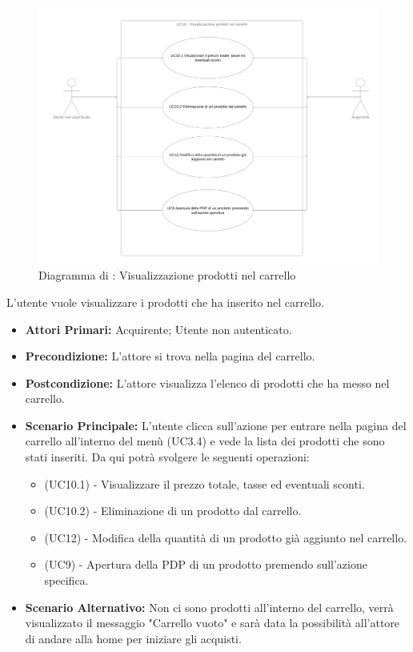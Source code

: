 \begin{figure}[H]
    \centering
    \includegraphics[width=\textwidth]{Immagini/DiagrammiUC/UC10VisualizzazioneProdottiNelCarrello.png}
    \caption{Diagramma di \actualUC: Visualizzazione prodotti nel carrello} 
    \label{fig:VisualizzazioneProdottiNelCarrello}
\end{figure}
L'utente vuole visualizzare i prodotti che ha inserito nel carrello.
\begin{itemize}
    \item \textbf{Attori Primari:} Acquirente; Utente non autenticato.
    \item \textbf{Precondizione:} L'attore si trova nella pagina del carrello.
    \item \textbf{Postcondizione:} L'attore visualizza l'elenco di prodotti che ha messo nel carrello.
    \item \textbf{Scenario Principale:} L'utente clicca sull'azione per entrare nella pagina del carrello all'interno del menù (UC3.4) e vede la lista dei prodotti che sono stati inseriti. Da qui potrà svolgere le seguenti operazioni:
    \begin{itemize}
        \item (UC10.1) - Visualizzare il prezzo totale, tasse ed eventuali sconti.
        \item (UC10.2) - Eliminazione di un prodotto dal carrello.
        \item (UC12) - Modifica della quantità di un prodotto già aggiunto nel carrello.
        \item (UC9) - Apertura della PDP di un prodotto premendo sull'azione specifica.
    \end{itemize}
    \item \textbf{Scenario Alternativo:} Non ci sono prodotti all'interno del carrello, verrà visualizzato il messaggio "Carrello vuoto" e sarà data la possibilità all'attore di andare alla home per iniziare gli acquisti.
\end{itemize}

